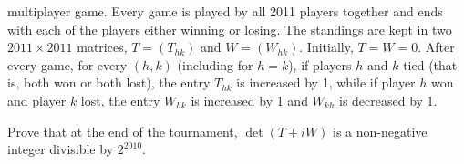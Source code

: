 multiplayer game. Every game is played by all 2011 players together and
ends with each of the players either winning or losing. The standings
are kept in two $2011 \times 2011$ matrices, $T = (T_{hk})$ and $W =
(W_{hk})$. Initially, $T=W=0$. After every game, for every $(h,k)$ (including
for $h=k$), if players $h$ and $k$ tied (that is, both won or both lost),
the entry $T_{hk}$ is increased by 1, while if player $h$ won and player $k$
lost, the entry $W_{hk}$ is increased by 1 and $W_{kh}$ is decreased by 1.

Prove that at the end of the tournament, $\det(T+iW)$ is a non-negative
integer divisible by $2^{2010}$.
